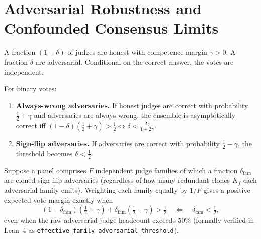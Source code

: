 \section{Adversarial Robustness and Confounded Consensus Limits}
\label{sec:adversarial}

\begin{assumption}
\label{asm:contamination}
A fraction $(1-\delta)$ of judges are honest with competence margin $\gamma > 0$.
A fraction $\delta$ are adversarial. Conditional on the correct answer, the votes are independent.
\end{assumption}

\begin{theorem}
\label{thm:adversarial}
For binary votes:
\begin{enumerate}[leftmargin=*,itemsep=2pt]
\item \textbf{Always-wrong adversaries.} If honest judges are correct with
  probability $\frac{1}{2} + \gamma$ and adversaries are always wrong, the
  ensemble is asymptotically correct iff
  $(1-\delta)(\tfrac{1}{2}+\gamma) > \tfrac{1}{2} \iff \delta < \frac{2\gamma}{1+2\gamma}$.
\item \textbf{Sign-flip adversaries.} If adversaries are correct with
  probability $\frac{1}{2} - \gamma$, the threshold becomes $\delta < \tfrac{1}{2}$.
\end{enumerate}
\end{theorem}

\begin{theorem}
\label{thm:effective-family-adv}
Suppose a panel comprises $F$ independent judge families of which a fraction
$\delta_{\mathrm{fam}}$ are cloned sign-flip adversaries (regardless of how many
redundant clones $K_f$ each adversarial family emits). Weighting each family
equally by $1/F$ gives a positive expected vote margin exactly when
\begin{equation}
\label{eq:effective-family-threshold}
(1 - \delta_{\mathrm{fam}})\!\left(\tfrac{1}{2}+\gamma\right)
  + \delta_{\mathrm{fam}}\!\left(\tfrac{1}{2}-\gamma\right) > \tfrac{1}{2}
\quad\Longleftrightarrow\quad
\delta_{\mathrm{fam}} < \tfrac{1}{2},
\end{equation}
even when the raw adversarial judge headcount exceeds $50\%$ (formally verified
in Lean~4 as \texttt{effective\_family\_adversarial\_threshold}).
\end{theorem}

